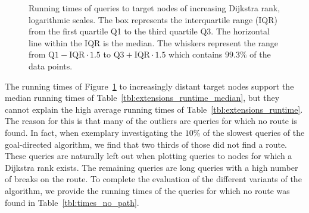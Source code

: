 \begin{figure}[hbtp]
	\centering
	\caption[Running times of queries to target nodes of increasing Dijkstra rank, logarithmic scales.]{Running times of queries to target nodes of increasing Dijkstra rank, logarithmic scales. The box represents the interquartile range (IQR) from the first quartile Q1 to the third quartile Q3. The horizontal line within the IQR is the median. The whiskers represent the range from $\text{Q1} - \text{IQR} \cdot 1.5$ to $\text{Q3} + \text{IQR} \cdot 1.5$ which contains $99.3\%$ of the data points.}
	\label{fig:rank_times}
\end{figure}

The running times of Figure~\ref{fig:rank_times} to increasingly distant target nodes support the median running times of Table~\ref{tbl:extensions_runtime_median}, but they cannot explain the high average running times of Table~\ref{tbl:extensions_runtime}. The reason for this is that many of the outliers are queries for which no route is found. In fact, when exemplary investigating the $10\%$ of the slowest queries of the goal-directed algorithm, we find that two thirds of those did not find a route. These queries are naturally left out when plotting queries to nodes for which a Dijkstra rank exists. The remaining queries are long queries with a high number of breaks on the route. To complete the evaluation of the different variants of the algorithm, we provide the running times of the queries for which no route was found in Table~\ref{tbl:times_no_path}.

